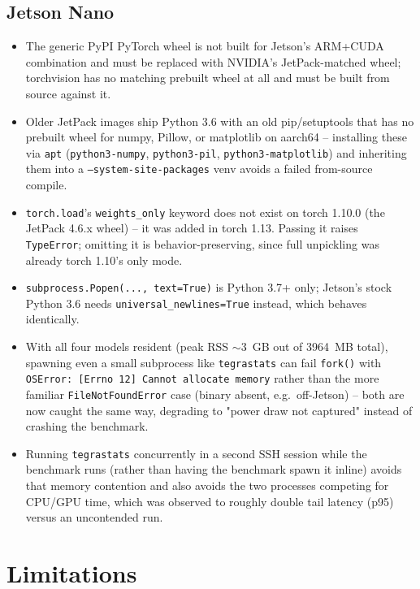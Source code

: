 \documentclass[11pt]{article}
\begin{document}
\subsection*{Jetson Nano}
\begin{itemize}[leftmargin=1.2em]
\item The generic PyPI PyTorch wheel is not built for Jetson's ARM+CUDA combination and
  must be replaced with NVIDIA's JetPack-matched wheel; torchvision has no matching
  prebuilt wheel at all and must be built from source against it.
\item Older JetPack images ship Python 3.6 with an old pip/setuptools that has no
  prebuilt wheel for numpy, Pillow, or matplotlib on aarch64 -- installing these via
  \texttt{apt} (\texttt{python3-numpy}, \texttt{python3-pil}, \texttt{python3-matplotlib})
  and inheriting them into a \texttt{--system-site-packages} venv avoids a failed
  from-source compile.
\item \texttt{torch.load}'s \texttt{weights\_only} keyword does not exist on torch
  1.10.0 (the JetPack 4.6.x wheel) -- it was added in torch 1.13. Passing it raises
  \texttt{TypeError}; omitting it is behavior-preserving, since full unpickling was
  already torch 1.10's only mode.
\item \texttt{subprocess.Popen(..., text=True)} is Python 3.7+ only; Jetson's stock
  Python 3.6 needs \texttt{universal\_newlines=True} instead, which behaves identically.
\item With all four models resident (peak RSS $\sim$3~GB out of 3964~MB total), spawning
  even a small subprocess like \texttt{tegrastats} can fail \texttt{fork()} with
  \texttt{OSError: [Errno 12] Cannot allocate memory} rather than the more familiar
  \texttt{FileNotFoundError} case (binary absent, e.g.\ off-Jetson) -- both are now caught
  the same way, degrading to "power draw not captured" instead of crashing the benchmark.
\item Running \texttt{tegrastats} concurrently in a second SSH session while the
  benchmark runs (rather than having the benchmark spawn it inline) avoids that memory
  contention and also avoids the two processes competing for CPU/GPU time, which was
  observed to roughly double tail latency (p95) versus an uncontended run.
\end{itemize}

\section{Limitations}
\end{document}
